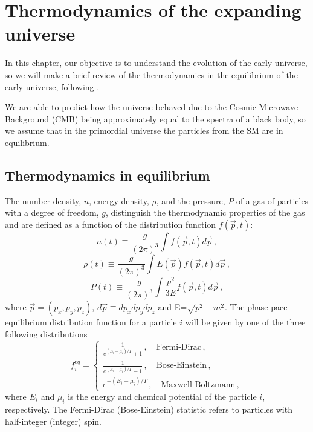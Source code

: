 \chapter{Thermodynamics of the expanding universe}
\label{chapter:thermodynamicsofearlyuniverse}

In this chapter, our objective is to understand the evolution of the early universe, so we will make a brief review of the thermodynamics in the equilibrium of the early universe, following \cite{kolb}.

We are able to predict how the universe behaved due to the Cosmic Microwave Background (CMB) being approximately equal to the spectra of a black body, so we assume that in the primordial universe the particles from the SM are in equilibrium.

\section{Thermodynamics in equilibrium}
The number density, $n$, energy density, $\rho$, and the pressure, $P$ of a gas of particles with a degree of freedom, $g$, distinguish the thermodynamic properties of the gas and are defined as a function of the distribution function $f(\vec{p},t)$:
\begin{equation}
	\label{eqn:3.1}
	n(t)\equiv\frac{g}{(2\pi)^3}\int f(\vec{p},t) d\vec{p}\,,
\end{equation}
\begin{equation}
	\label{eqn:3.2}
	\rho(t)\equiv\frac{g}{(2\pi)^3}\int E(\vec{p})f(\vec{p},t) d\vec{p}\,,
\end{equation} 
\begin{equation}
	\label{eqn:3.3}
	P(t)\equiv\frac{g}{(2\pi)^3}\int \frac{p^2}{3E}f(\vec{p},t) d\vec{p}\,,
\end{equation}  
where $\vec{p}=(p_x,p_y,p_z)$, $d\vec{p}\equiv dp_xdp_ydp_z$ and E=$\sqrt{p^2+m^2}$. The phase pace equilibrium distribution function for a particle $i$ will be given by one of the three following distributions
\begin{equation}
	f_i^{eq} = \left\{ 
	\begin{array}{lll}
		\frac{1}{e^{(E_i-\mu_i)/T}+1}\,, \quad\textrm{Fermi-Dirac}\,,\\
		\frac{1}{e^{(E_i-\mu_i)/T}-1}\,, \quad\textrm{Bose-Einstein}\,,\\
		e^{-(E_i-\mu_i)/T}\,, \quad \textrm{Maxwell-Boltzmann}\,,	
	\end{array}
	\right.
\end{equation}
where $E_i$ and $\mu_i$ is the energy and chemical potential of the particle $i$, respectively. The Fermi-Dirac (Bose-Einstein) statistic refers to particles with half-integer (integer) spin.

